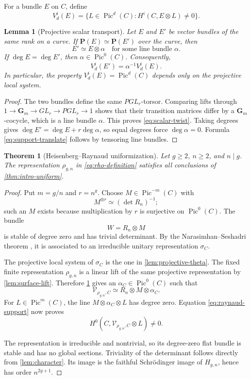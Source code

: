 \documentclass[11pt,reqno]{amsart}
\numberwithin{equation}{section}
\newtheorem{theorem}{Theorem}[section]
\newtheorem{lemma}[lemma]{Lemma}
\theoremstyle{remark}
\DeclareMathOperator{\Pic}{Pic}
\newcommand{\cV}{\mathcal V}
\newcommand{\bG}{\mathbf G}
\newcommand{\bP}{\mathbf P}
\begin{document}
For a bundle \(E\) on \(C\), define
\[
 V_d^i(E)=
 \{L\in\Pic^d(C):H^i(C,E\otimes L)\neq0\}.
\tag{3.7}\label{eq:support-locus}
\]

\begin{lemma}[Projective scalar transport]\label{lem:scalar-transport}
Let \(E\) and \(E'\) be vector bundles of the same rank on a curve.  If
\(\bP(E)\simeq\bP(E')\) over the curve, then
\[
 E'\simeq E\otimes\alpha
 \quad\text{for some line bundle }\alpha.
\tag{3.8}\label{eq:scalar-twist}
\]
If \(\deg E=\deg E'\), then \(\alpha\in\Pic^0(C)\).
Consequently,
\[
 V_d^i(E')=\alpha^{-1}V_d^i(E).
\tag{3.9}\label{eq:support-translate}
\]
In particular, the property \(V_d^i(E)=\Pic^d(C)\) depends only on the
projective local system.
\end{lemma}

\begin{proof}
The two bundles define the same \(PGL_r\)-torsor.  Comparing lifts through
\(1\to\bG_m\to GL_r\to PGL_r\to1\) shows that their transition matrices
differ by a \(\bG_m\)-cocycle, which is a line bundle \(\alpha\).  This
proves \eqref{eq:scalar-twist}.  Taking degrees gives
\(\deg E'=\deg E+r\deg\alpha\), so equal degrees force
\(\deg\alpha=0\).  Formula \eqref{eq:support-translate} follows by
tensoring line bundles.
\end{proof}

\begin{theorem}[Heisenberg--Raynaud uniformization]\label{thm:uniform}
Let \(g\geq2\), \(n\geq2\), and \(n\mid g\).  The representation
\(\rho_{g,n}\) in \eqref{eq:rho-definition} satisfies all conclusions
of \cref{thm:intro-uniform}.
\end{theorem}

\begin{proof}
Put \(m=g/n\) and \(r=n^g\).  Choose
\(M\in\Pic^{-m}(C)\) with
\[
 M^{\otimes r}\simeq(\det R_n)^{-1};
\tag{3.10}\label{eq:det-normalization}
\]
such an \(M\) exists because multiplication by \(r\) is surjective on
\(\Pic^0(C)\).  The bundle
\[
 W=R_n\otimes M
\]
is stable of degree zero and has trivial determinant.  By the
Narasimhan--Seshadri theorem \cite{NarasimhanSeshadri}, it is associated
to an irreducible unitary representation \(\sigma_C\).

The projective local system of \(\sigma_C\) is the one in
\cref{lem:projective-theta}.  The fixed finite representation
\(\rho_{g,n}\) is a linear lift of the same projective representation by
\cref{lem:surface-lift}.  Therefore
\cref{lem:scalar-transport} gives an \(\alpha_C\in\Pic^0(C)\) such that
\[
 \cV_{\rho_{g,n},C}
 \simeq R_n\otimes M\otimes\alpha_C.
\tag{3.11}\label{eq:uniform-identification}
\]
For \(L\in\Pic^m(C)\), the line
\(M\otimes\alpha_C\otimes L\) has degree zero.  Equation
\eqref{eq:raynaud-support} now proves
\[
 H^0(C,\cV_{\rho_{g,n},C}\otimes L)\neq0.
\]

The representation is irreducible and nontrivial, so its degree-zero
flat bundle is stable and has no global sections.  Triviality of the
determinant follows directly from \cref{lem:character}.  Its image is
the faithful Schr\"odinger image of \(H_{g,n}\), hence has order
\(n^{2g+1}\).
\end{proof}
\end{document}
